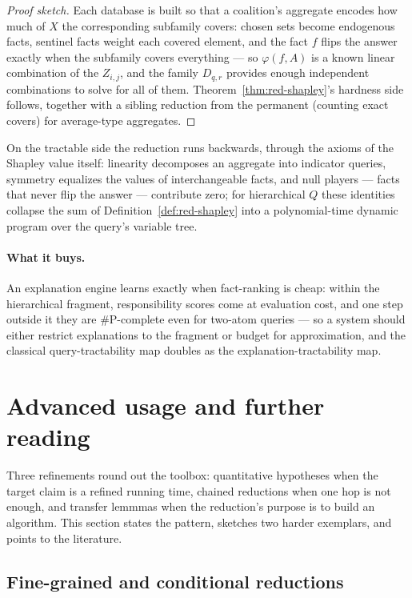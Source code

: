 \begin{proof}[Proof sketch]
Each database is built so that a coalition's aggregate encodes how much of $X$ the
corresponding subfamily covers: chosen sets become endogenous facts, sentinel facts
weight each covered element, and the fact $f$ flips the answer exactly when the
subfamily covers everything --- so $\varphi(f, A)$ is a known linear combination of
the $Z_{i,j}$, and the family $D_{q,r}$ provides enough independent combinations to
solve for all of them. Theorem~\ref{thm:red-shapley}'s hardness side follows, together
with a sibling reduction from the permanent (counting exact covers) for average-type
aggregates.
\end{proof}

On the tractable side the reduction runs backwards, through the axioms of the Shapley
value itself: linearity decomposes an aggregate into indicator queries, symmetry
equalizes the values of interchangeable facts, and null players --- facts that never
flip the answer --- contribute zero; for hierarchical $Q$ these identities collapse
the sum of Definition~\ref{def:red-shapley} into a polynomial-time dynamic program
over the query's variable tree.

\paragraph{What it buys.}
An explanation engine learns exactly when fact-ranking is cheap: within the
hierarchical fragment, responsibility scores come at evaluation cost, and one step
outside it they are \#P-complete even for two-atom queries --- so a system should
either restrict explanations to the fragment or budget for approximation, and the
classical query-tractability map doubles as the explanation-tractability map.

\section{Advanced usage and further reading}
\label{sec:red-advanced}

Three refinements round out the toolbox: quantitative hypotheses when the target claim
is a refined running time, chained reductions when one hop is not enough, and transfer
lemmmas when the reduction's purpose is to build an algorithm. This section states the
pattern, sketches two harder exemplars, and points to the literature.

\subsection{Fine-grained and conditional reductions}
\label{sec:red-finegrained}

